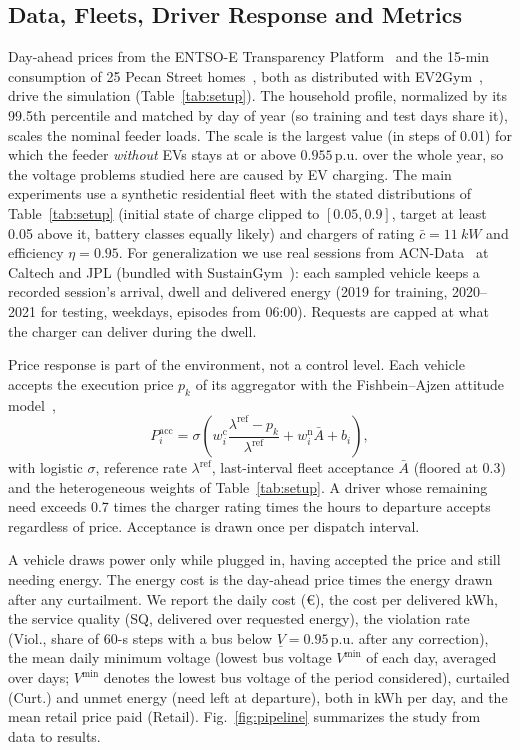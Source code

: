 \documentclass[journal]{IEEEtran}
\newcommand{\pu}{\,\mathrm{p.u.}}
\newcommand{\vlim}{\underline{V}}
\begin{document}
\subsection{Data, Fleets, Driver Response and Metrics}
\label{sec:metrics}
Day-ahead prices from the ENTSO-E Transparency Platform~\cite{hirth2018} and
the 15-min consumption of 25 Pecan Street homes~\cite{pecanstreet}, both as
distributed with EV2Gym~\cite{orfanoudakis2025ev2gym}, drive the simulation
(Table~\ref{tab:setup}). The household profile, normalized by its 99.5th
percentile and matched by day of year (so training and test days share it),
scales the nominal feeder loads. The scale is the largest value (in steps of
0.01) for which the feeder \emph{without} EVs stays at or above $0.955\pu$
over the whole year, so the voltage problems studied here are caused by EV
charging. The main experiments use a synthetic residential fleet with the
stated distributions of Table~\ref{tab:setup} (initial state of charge clipped
to $[0.05,0.9]$, target at least 0.05 above it, battery classes equally likely)
and chargers of rating $\bar c=\SI{11}{kW}$ and efficiency $\eta=0.95$. For
generalization we use real sessions from ACN-Data~\cite{lee2019acn} at Caltech
and JPL (bundled with SustainGym~\cite{yeh2023sustaingym}): each sampled
vehicle keeps a recorded session's arrival, dwell and delivered energy (2019
for training, 2020--2021 for testing, weekdays, episodes from 06:00).
Requests are capped at what the charger can deliver during the dwell.

Price response is part of the environment, not a control level. Each vehicle
accepts the execution price $p_k$ of its aggregator with the Fishbein--Ajzen
attitude model~\cite{fishbein1975},
\begin{equation}
P^{\mathrm{acc}}_i=\sigma\!\left(w^{\mathrm{c}}_i\frac{\lambda^{\mathrm{ref}}-p_k}{\lambda^{\mathrm{ref}}}+w^{\mathrm{n}}_i\bar A+b_i\right),
\label{eq:fishbein}
\end{equation}
with logistic $\sigma$, reference rate $\lambda^{\mathrm{ref}}$, last-interval
fleet acceptance $\bar A$ (floored at 0.3) and the heterogeneous weights of
Table~\ref{tab:setup}. A driver whose remaining need exceeds 0.7 times the
charger rating times the hours to departure accepts regardless of price.
Acceptance is drawn once per dispatch interval.

A vehicle draws power only while plugged in, having accepted the price and
still needing energy. The energy cost is the day-ahead price times the energy
drawn after any curtailment. We report the daily cost (\euro), the cost per
delivered kWh, the service quality (SQ, delivered over requested energy), the
violation rate (Viol., share of 60-s steps with a bus below $\vlim=0.95\pu$
after any correction), the mean daily minimum voltage (lowest bus voltage
$V^{\min}$ of each day, averaged over days; $V^{\min}$ denotes the lowest bus
voltage of the period considered), curtailed (Curt.) and unmet energy (need
left at departure), both in kWh per day, and the mean retail price paid
(Retail). Fig.~\ref{fig:pipeline} summarizes the study from data to results.
\end{document}
